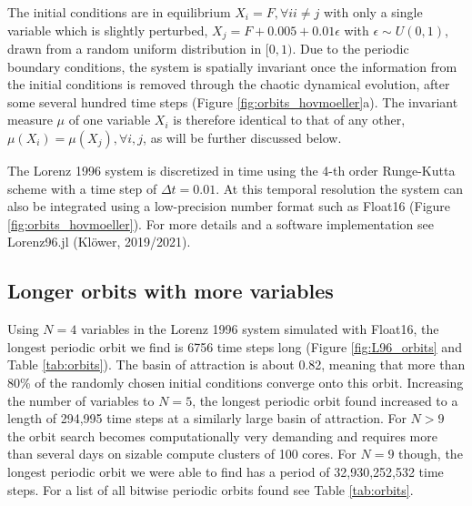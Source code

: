 The initial conditions are in equilibrium $X_i = F, \forall i i \neq j$ with only a single variable which is slightly perturbed, 
$X_j = F + 0.005 + 0.01\epsilon$ with $\epsilon \sim U(0,1)$, drawn from a random uniform distribution in $[0,1)$.
Due to the periodic boundary conditions, the system is spatially invariant once the information from the initial conditions
is removed through the chaotic dynamical evolution, after some several hundred time steps (Figure \ref{fig:orbits_hovmoeller}a).
The invariant measure $\mu$ of one variable $X_i$ is therefore identical to that of any other, $\mu(X_i) = \mu(X_j), \forall i,j$,
as will be further discussed below.

The Lorenz 1996 system is discretized in time using the 4-th order Runge-Kutta scheme \citep{Butcher2008} with a time
step of $\Delta t = 0.01$. At this temporal resolution the system can also be integrated using a low-precision number format
such as Float16 (Figure \ref{fig:orbits_hovmoeller}). For more details and a software implementation see Lorenz96.jl (Klöwer, 2019/2021).

\subsection{Longer orbits with more variables}

Using $N=4$ variables in the Lorenz 1996 system simulated with Float16, the longest periodic orbit we find is 6756 time steps long
(Figure \ref{fig:L96_orbits} and Table \ref{tab:orbits}). The basin of attraction is about 0.82, meaning that more than 80\% of the randomly chosen initial
conditions converge onto this orbit. Increasing the number of variables to $N=5$, the longest periodic orbit found increased
to a length of 294,995 time steps at a similarly large basin of attraction. For $N>9$ the orbit search becomes computationally
very demanding and requires more than several days on sizable compute clusters of 100 cores. For $N=9$ though, the longest
periodic orbit we were able to find has a period of 32,930,252,532 time steps. For a list of all bitwise periodic orbits found see Table
\ref{tab:orbits}.

